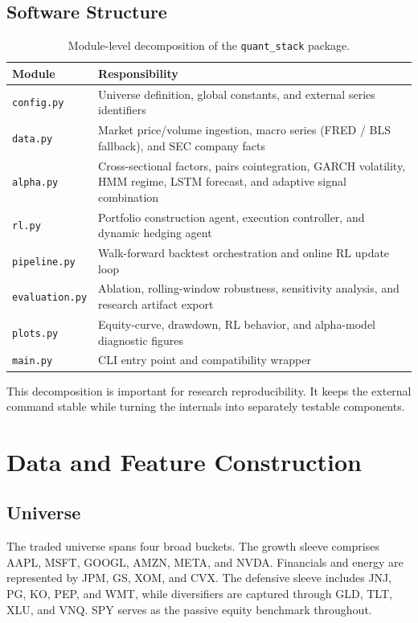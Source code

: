 \documentclass[11pt]{article}
\begin{document}
\subsection{Software Structure}

\begin{table}[H]
\centering
\caption{Module-level decomposition of the \texttt{quant\_stack} package.}
\begin{tabular}{@{} l p{9.5cm} @{}}
\toprule
\textbf{Module} & \textbf{Responsibility} \\
\midrule
\texttt{config.py}   & Universe definition, global constants, and external series identifiers \\
\texttt{data.py}     & Market price/volume ingestion, macro series (FRED / BLS fallback), and SEC company facts \\
\texttt{alpha.py}    & Cross-sectional factors, pairs cointegration, GARCH volatility, HMM regime, LSTM forecast, and adaptive signal combination \\
\texttt{rl.py}       & Portfolio construction agent, execution controller, and dynamic hedging agent \\
\texttt{pipeline.py} & Walk-forward backtest orchestration and online RL update loop \\
\texttt{evaluation.py} & Ablation, rolling-window robustness, sensitivity analysis, and research artifact export \\
\texttt{plots.py}    & Equity-curve, drawdown, RL behavior, and alpha-model diagnostic figures \\
\texttt{main.py}     & CLI entry point and compatibility wrapper \\
\bottomrule
\end{tabular}
\end{table}

This decomposition is important for research reproducibility. It keeps the
external command stable while turning the internals into separately testable
components.

\section{Data and Feature Construction}

\subsection{Universe}

The traded universe spans four broad buckets. The growth sleeve comprises AAPL,
MSFT, GOOGL, AMZN, META, and NVDA. Financials and energy are represented by JPM,
GS, XOM, and CVX. The defensive sleeve includes JNJ, PG, KO, PEP, and WMT, while
diversifiers are captured through GLD, TLT, XLU, and VNQ. SPY serves as the
passive equity benchmark throughout.
\end{document}

